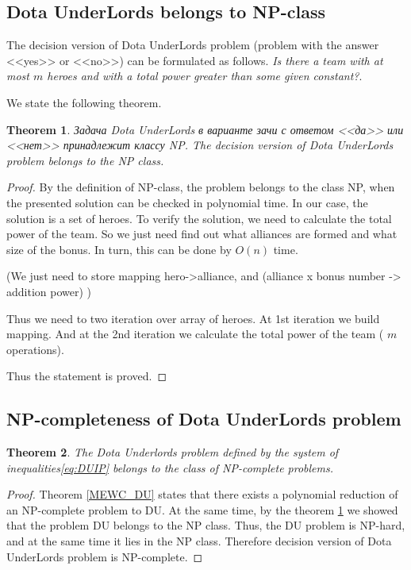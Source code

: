 \documentclass{article}
\newtheorem{theorem}{Theorem}
\begin{document}
\subsection{Dota UnderLords belongs to NP-class}
The decision version of Dota UnderLords problem (problem with the answer <<yes>> or <<no>>) can be formulated as follows. \textit {Is there a team with at most $ m $ heroes and with a total power greater than some given constant?}.

We state the following theorem.
\begin{theorem}
\label{DU_is_NP}
Задача Dota UnderLords в варианте зачи с ответом <<да>> или <<нет>>  принадлежит классу NP.
The decision version of Dota UnderLords problem belongs to the  NP class.
\end{theorem}
\begin{proof}

By the definition of NP-class, the problem belongs to the class NP, when the presented solution can be checked in polynomial time. In our case, the solution is a set of heroes. To verify the solution, we need to calculate the total power of the team. So we just need find out what alliances are formed and what size of the bonus. In turn, this can be done by $ O (n) $ time. 

(We just need to store mapping  hero->alliance, and (alliance x bonus number -> addition power) )

Thus we need to two iteration over array of heroes. At 1st iteration we build mapping. And at the 2nd iteration we calculate the total power of the team ( $m$ operations).

Thus the statement is proved.
\end{proof}

\subsection{NP-completeness of Dota UnderLords problem}
\begin{theorem}
	The Dota Underlords problem defined by the system of inequalities\eqref{eq:DUIP}  belongs to the class of NP-complete problems.
\end{theorem}

\begin{proof}
Theorem \ref{MEWC_DU} states that there exists a polynomial reduction of an NP-complete problem to DU. At the same time, by the theorem \ref{DU_is_NP} we showed that the problem DU belongs to the NP class. Thus, the DU problem is NP-hard, and at the same time it lies in the NP class. Therefore decision version of Dota UnderLords problem is NP-complete.	
\end{proof}
\end{document}
